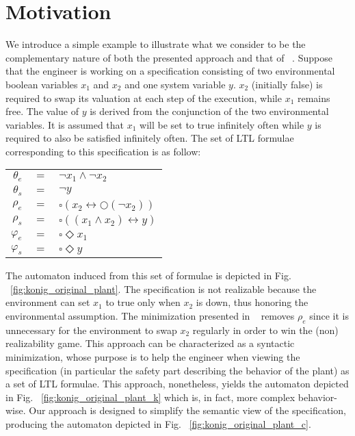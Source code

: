 \clearpage
\section{Motivation}\label{sec:motivation}

We introduce a simple example to illustrate what we consider to be the complementary nature 
of both the presented approach and that of ~\cite{DBLP:conf/hvc/KonighoferHB10}. Suppose that the engineer is working on a specification consisting of two environmental boolean variables $x_1$ and $x_2$ and one system variable $y$. $x_2$ (initially false) is required to swap its valuation at each step of the execution, while $x_1$ remains free. The value of $y$ is derived from the conjunction of the two environmental variables.
It is assumed that $x_1$ will be set to true infinitely often while $y$ is required to also be satisfied infinitely often. The set of LTL formulae corresponding to this specification is as follow: 
\begin{center}
	\begin{tabular}{ r c l }
	$\theta_e$& $=$ &$\neg x_1 \wedge \neg x_2$\\
	$\theta_s$& $=$ &$\neg y$\\
	$\rho_e$& $=$ &$\square(x_2 \leftrightarrow \bigcirc(\neg x_2))$\\
	$\rho_s$& $=$ &$\square((x_1 \wedge x_2) \leftrightarrow y)$\\
	$\varphi_e$& $=$ &$\square \Diamond x_1$\\
	$\varphi_s$& $=$ &$\square \Diamond y$\\
\end{tabular}
\end{center}

The automaton induced from this set of formulae is depicted in Fig. ~\ref{fig:konig_original_plant}. The specification is not realizable because the environment can set $x_1$ to true only when $x_2$ is down, thus honoring the environmental assumption. The minimization presented in ~\cite{DBLP:conf/hvc/KonighoferHB10} removes $\rho_e$ since it is unnecessary for the environment to swap $x_2$ regularly in order to win the (non) realizability game. This approach can be characterized as a syntactic minimization, whose purpose is to help the engineer when viewing the specification (in particular the safety part describing the behavior of the plant) as a set of LTL formulae. This approach, nonetheless, yields the automaton depicted in Fig. ~\ref{fig:konig_original_plant_k} which is, in fact, more complex behavior-wise. Our approach is designed to simplify the semantic view of the specification, producing the automaton depicted in Fig. ~\ref{fig:konig_original_plant_c}. 

